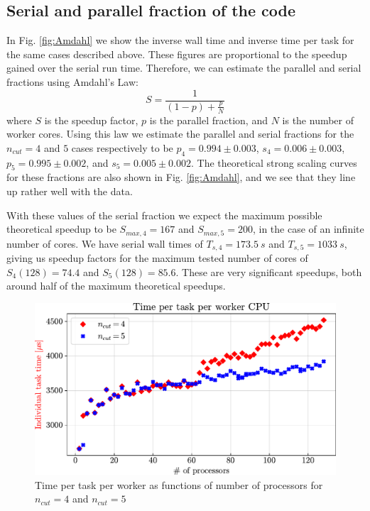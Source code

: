 \documentclass{article}
\begin{document}
\subsection{Serial and parallel fraction of the code}
In Fig. \ref{fig:Amdahl} we show the inverse wall time and inverse time per task for the same cases described above. These figures are proportional to the speedup gained over the serial run time. Therefore, we can estimate the parallel and serial fractions using Amdahl's Law:
\begin{equation}
    S = \frac{1}{(1-p)+\frac{p}{N}}
\end{equation}
where $S$ is the speedup factor, $p$ is the parallel fraction, and $N$ is the number of worker cores. Using this law we estimate the parallel and serial fractions for the $n_{cut}=4$ and $5$ cases respectively to be $p_4=0.994\pm0.003$,\; $s_4=0.006\pm0.003$,\; $p_5=0.995\pm0.002$, and $s_5=0.005\pm0.002$. The theoretical strong%
scaling curves for these fractions are also shown in Fig. \ref{fig:Amdahl}, and we see that they line up rather well with the data. 

With these values of the serial fraction we expect the maximum possible theoretical speedup to be $S_{max,4}=167$ and $S_{max,5}=200$, in the case of an infinite number of cores. We have serial wall times of $T_{s,4}=\qty{173.5}{s}$ and $T_{s,5}=\qty{1033}{s}$, giving us speedup factors for the maximum tested number of cores of $S_4(128)=74.4$ and $S_5(128)=85.6$. These are very significant speedups, both around half of the maximum theoretical speedups.
\begin{figure}
    \centering
    \includegraphics[width=1\textwidth]{Assignment_3_Task_farming/Report/CPU_time.pdf}
    \caption{Time per task per worker as functions of number of processors for $n_{cut}=4$ and $n_{cut}=5$}
    \label{fig:CPU}
\end{figure}
\end{document}
